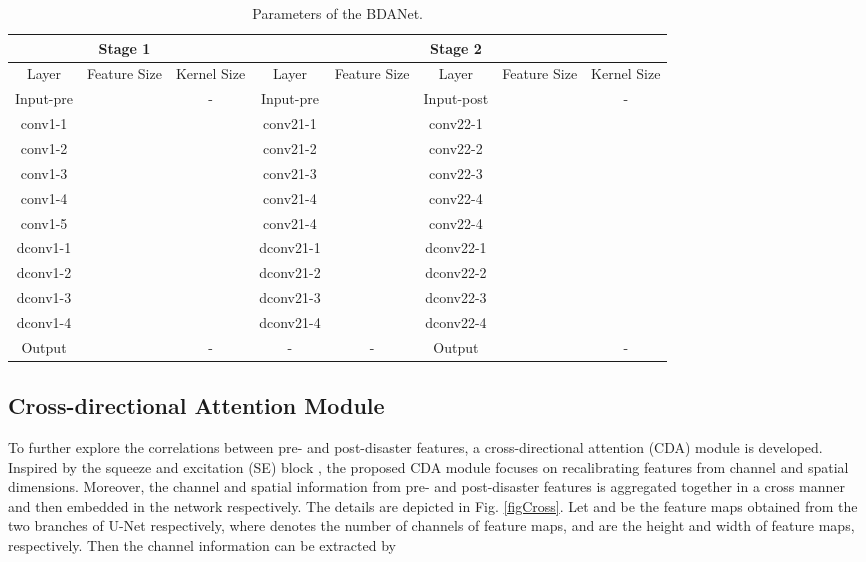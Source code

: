 \documentclass[journal]{IEEEtran}
\begin{document}
\begin{table*}[!t]
	\centering
	\caption{Parameters of the BDANet.}
	\setlength{\tabcolsep}{2.5mm} {
	\begin{tabular}{ccc|ccccc}
		\hline \hline
		& Stage 1 & & & & Stage 2 & & \\
		\hline
		Layer  &  Feature Size &  Kernel Size & Layer  &  Feature Size  & Layer & Feature Size & Kernel Size\\
		\hline
		Input-pre &   & - & Input-pre &   & Input-post &   & - \\
		conv1-1 &  &  & conv21-1 & & conv22-1  &  & \\
		conv1-2 &   &   & conv21-2 &  & conv22-2 &  & \\
		conv1-3 &   &   & conv21-3 &  & conv22-3 &   & \\
		conv1-4 &   &   & conv21-4 &   & conv22-4 &    & \\
		conv1-5 &   &   & conv21-4 &   & conv22-4 &    & \\
		dconv1-1 &   &   & dconv21-1 &   & dconv22-1 &    & \\
		dconv1-2 &   &   & dconv21-2 &   & dconv22-2 &    & \\
		dconv1-3 &   &   & dconv21-3 &    & dconv22-3 &    & \\
		dconv1-4 &   &   & dconv21-4 &    & dconv22-4 &    & \\
		Output &   & - & - & - & Output &   & - \\
\hline	\hline	
	\end{tabular}}
	\label{tabParameters}
\end{table*}

\subsection{Cross-directional Attention Module} 
To further explore the correlations between pre- and post-disaster features, a cross-directional attention (CDA) module is developed. Inspired by the squeeze and excitation (SE) block \cite{royRecalibratingFullyConvolutional2019}, the proposed CDA module focuses on recalibrating features from channel and spatial dimensions. 
Moreover, the channel and spatial information from  pre- and post-disaster features is aggregated together in a cross manner and then embedded in the network respectively. The details are depicted in Fig. \ref{figCross}. Let  and  be the feature maps obtained from the two branches of U-Net respectively, where  denotes the number of channels of feature maps,  and  are the height and width of feature maps, respectively. Then the channel information can be extracted by
\end{document}
